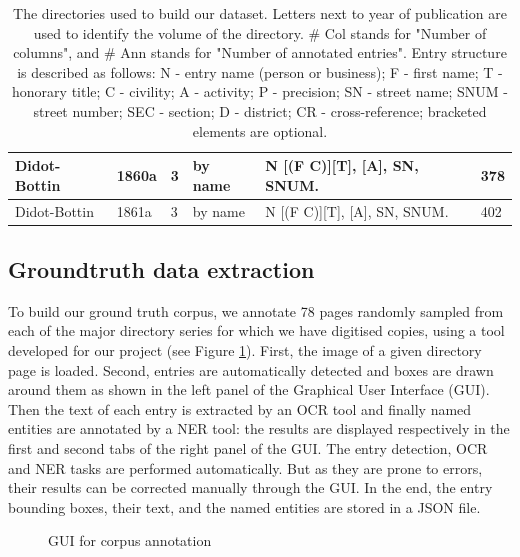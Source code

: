 \begin{table}[h!]
{\begin{tabular}{|l|l|l|l|l|l|}
\\ \hline
Didot-Bottin & 1860a	& 3	& by name & N [(F \textbar C)][T], [A], SN, SNUM. & 378
\\ \hline
Didot-Bottin & 1861a	& 3	& by name & N [(F \textbar C)][T], [A], SN, SNUM. & 402
\\ \hline
\end{tabular}%
}
\caption{The directories used to build our dataset. Letters next to year of publication are used to identify the volume of the directory. \# Col stands for "Number of columns", and \# Ann stands for "Number of annotated entries". Entry structure is described as follows: N - entry name (person or business); F - first name; T - honorary title; C - civility; A - activity; P - precision; SN - street name; SNUM - street number; SEC - section; D - district; CR - cross-reference; bracketed elements are optional.}
\label{tab:directories}
\end{table}

\subsection{Groundtruth data extraction}

To build our ground truth corpus, we annotate 78 pages randomly sampled from each of the major directory series for which we have digitised copies, using a tool developed for our project (see Figure \ref{fig:annotator}). First, the image of a given directory page is loaded. Second, entries are automatically detected and boxes are drawn around them as shown in the left panel of the Graphical User Interface (GUI). Then the text of each entry is extracted by an OCR tool and finally named entities are annotated by a NER tool: the results are displayed respectively in the first and second tabs of the right panel of the GUI. The entry detection, OCR and NER tasks are performed automatically. But as they are prone to errors, their results can be corrected manually through the GUI. In the end, the entry bounding boxes, their text, and the named entities are stored in a JSON file.

\begin{figure}[htb!]
	  \caption{\label{fig:annotator} GUI for corpus annotation }
\end{figure}

